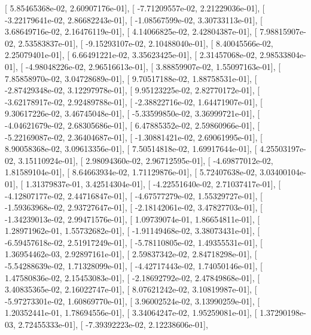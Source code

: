 \documentclass{article}
\begin{document}
       [  5.85465368e-02,   2.60907176e-01],
       [ -7.71209557e-02,   2.21229036e-01],
       [ -3.22179641e-02,   2.86682243e-01],
       [ -1.08567599e-02,   3.30733113e-01],
       [  3.68649716e-02,   2.16476119e-01],
       [  4.14066825e-02,   2.42804387e-01],
       [  7.98815907e-02,   2.53583837e-01],
       [ -9.15293107e-02,   2.10488040e-01],
       [  8.40045566e-02,   2.25079401e-01],
       [  6.66491221e-02,   3.35623425e-01],
       [  2.31457068e-02,   2.98533804e-01],
       [ -4.98048226e-02,   2.96516613e-01],
       [  3.88859907e-02,   1.55097163e-01],
       [  7.85858970e-02,   3.04728689e-01],
       [  9.70517188e-02,   1.88758531e-01],
       [ -2.87429348e-02,   3.12297978e-01],
       [  9.95123225e-02,   2.82770172e-01],
       [ -3.62178917e-02,   2.92489788e-01],
       [ -2.38822716e-02,   1.64471907e-01],
       [  9.30617226e-02,   3.46745048e-01],
       [ -5.33599850e-02,   3.36999721e-01],
       [ -4.04621679e-02,   2.68305686e-01],
       [  6.47885352e-02,   2.59860966e-01],
       [ -5.22169087e-02,   2.36404687e-01],
       [ -1.30881421e-02,   2.69061995e-01],
       [  8.90058368e-02,   3.09613356e-01],
       [  7.50514818e-02,   1.69917644e-01],
       [  4.25503197e-02,   3.15110924e-01],
       [  2.98094360e-02,   2.96712595e-01],
       [ -4.69877012e-02,   1.81589104e-01],
       [  8.64663934e-02,   1.71129876e-01],
       [  5.72407638e-02,   3.03400104e-01],
       [  1.31379837e-01,   3.42514304e-01],
       [ -4.22551640e-02,   2.71037417e-01],
       [ -4.12807177e-02,   2.44716847e-01],
       [ -4.67577279e-02,   1.55329727e-01],
       [ -1.59363968e-02,   2.93727647e-01],
       [ -2.18142061e-02,   3.47827703e-01],
       [ -1.34239013e-02,   2.99471576e-01],
       [  1.09739074e-01,   1.86654811e-01],
       [  1.28971962e-01,   1.55732682e-01],
       [ -1.91149468e-02,   3.38073431e-01],
       [ -6.59457618e-02,   2.51917249e-01],
       [ -5.78110805e-02,   1.49355531e-01],
       [  1.36954462e-03,   2.92897161e-01],
       [  2.59837342e-02,   2.84718298e-01],
       [ -5.54288639e-02,   1.71328099e-01],
       [ -4.42717443e-02,   1.74050146e-01],
       [  1.47580836e-02,   2.15453083e-01],
       [ -2.18692792e-02,   2.47849868e-01],
       [  3.40835365e-02,   2.16022747e-01],
       [  8.07621242e-02,   3.10819987e-01],
       [ -5.97273301e-02,   1.60869770e-01],
       [  3.96002524e-02,   3.13990259e-01],
       [  1.20352441e-01,   1.78694556e-01],
       [  3.34064247e-02,   1.95259081e-01],
       [  1.37290198e-03,   2.72455333e-01],
       [ -7.39392223e-02,   2.12238606e-01],
\end{document}
